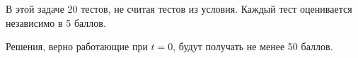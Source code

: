 В этой задаче 20 тестов, не считая тестов из условия. Каждый тест оценивается независимо в 5 баллов.

Решения, верно работающие при $t = 0$, будут получать не менее 50 баллов.